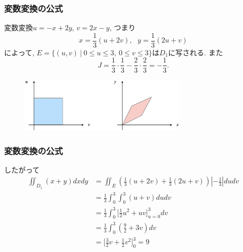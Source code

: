 \begin{frame}
\frametitle{変数変換の公式}
変数変換$u=-x+2y$, $v=2x-y$, つまり
$$
x=\frac{1}{3}(u+2v), \ \ \ y=\frac{1}{3}(2u+v)
$$
によって, $E= \{(u,v) \ | \ 0 \le u \le 3, \ 0 \le v \le 3\}$は$D_1$に写される. 
また
$$
J  = \frac{1}{3}\cdot \frac{1}{3}-\frac{2}{3} \cdot \frac{2}{3}=-\frac{1}{3}. 
$$
\begin{figure}[htbp]
 \begin{center} 
  \includegraphics[width=80mm]{calculus13/skew.png}
 \end{center}
\end{figure}

\end{frame}



\begin{frame}
\frametitle{変数変換の公式}

したがって
\begin{align*}
\iint_{D_1} (x+y) dxdy & = \iint_E (\frac{1}{3}(u+2v)+\frac{1}{3}(2u+v) ) |-\frac{1}{3}|dudv \\
& = \frac{1}{3} \int_0^3 \int_0^3 (u+v) dudv \\
& = \frac{1}{3}\int_0^3 \big[\frac{1}{2}u^2+uv\big]_{u=0}^3dv  \\
& =  \frac{1}{3}\int_0^3(\frac{9}{2}+3v)dv\\
&= \big[\frac{3}{2}v+\frac{1}{2}v^2\big]_0^3 = 9 
\end{align*}

\end{frame}



%
%
%




